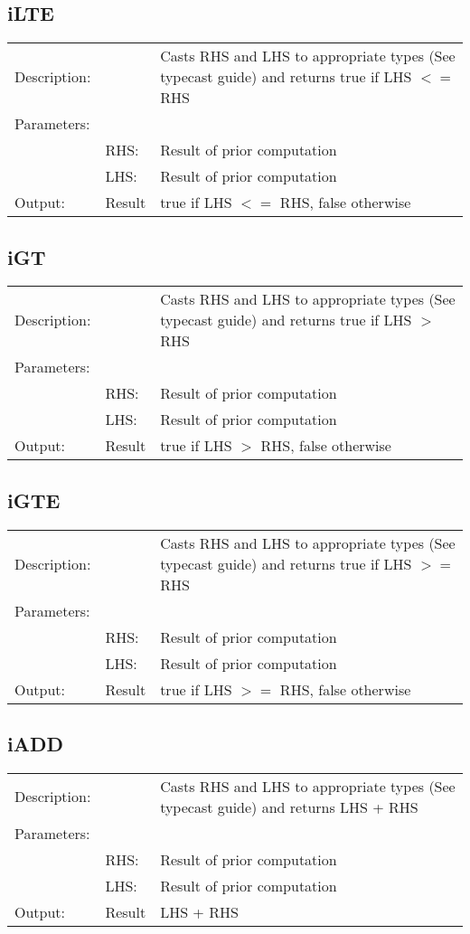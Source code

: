 \documentclass{standalone}
\begin{document}
\subsection{iLTE}
\begin{tabular}{l l p{10cm}}
Description: & ~    & Casts RHS and LHS to appropriate types (See typecast guide) and returns true if LHS $<=$ RHS\\
Parameters:  & ~ & ~ \\
~			 & RHS: & Result of prior computation\\
~			 & LHS: & Result of prior computation\\
Output:      & Result & true if LHS $<=$ RHS, false otherwise\\
\end{tabular}

\subsection{iGT}
\begin{tabular}{l l p{10cm}}
Description: & ~    & Casts RHS and LHS to appropriate types (See typecast guide) and returns true if LHS $>$ RHS\\
Parameters:  & ~ & ~ \\
~			 & RHS: & Result of prior computation\\
~			 & LHS: & Result of prior computation\\
Output:      & Result & true if LHS $>$ RHS, false otherwise\\
\end{tabular}

\subsection{iGTE}
\begin{tabular}{l l p{10cm}}
Description: & ~    & Casts RHS and LHS to appropriate types (See typecast guide) and returns true if LHS $>=$ RHS\\
Parameters:  & ~ & ~ \\
~			 & RHS: & Result of prior computation\\
~			 & LHS: & Result of prior computation\\
Output:      & Result & true if LHS $>=$ RHS, false otherwise\\
\end{tabular}

\subsection{iADD}
\begin{tabular}{l l p{10cm}}
Description: & ~    & Casts RHS and LHS to appropriate types (See typecast guide) and returns LHS + RHS\\
Parameters:  & ~ & ~ \\
~			 & RHS: & Result of prior computation\\
~			 & LHS: & Result of prior computation\\
Output:      & Result & LHS + RHS\\
\end{tabular}
\end{document}
